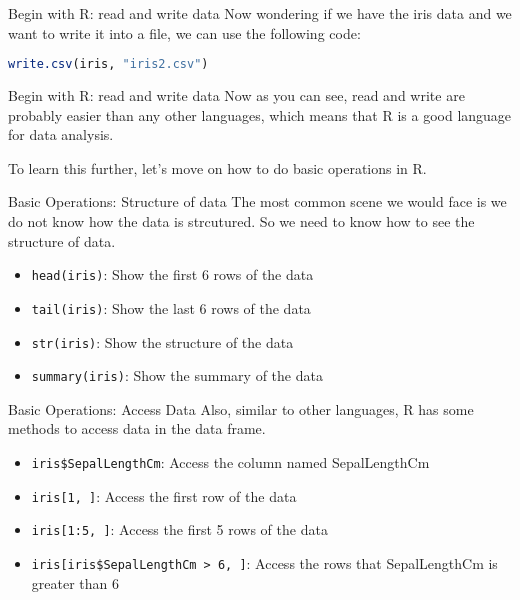 \documentclass[aspectratio=169]{beamer}
\begin{document}
    \begin{frame}[fragile]{Begin with R: read and write data}
        Now wondering if we have the iris data and we want to write it into a file, we can use the following code:\par
        \begin{lstlisting}[language=R]
        write.csv(iris, "iris2.csv")
        \end{lstlisting}
    \end{frame}

    \begin{frame}{Begin with R: read and write data}
        Now as you can see, read and write are probably easier than any other languages, which means that R is a good language for data analysis.\par
        To learn this further, let's move on how to do basic operations in R.\par
    \end{frame}

    \begin{frame}{Basic Operations: Structure of data}
        The most common scene we would face is we do not know how the data is strcutured. So we need to know how to see the structure of data.\par
        \begin{itemize}
            \item \texttt{head(iris)}: Show the first 6 rows of the data
            \item \texttt{tail(iris)}: Show the last 6 rows of the data
            \item \texttt{str(iris)}: Show the structure of the data
            \item \texttt{summary(iris)}: Show the summary of the data
        \end{itemize}
    \end{frame}

    \begin{frame}{Basic Operations: Access Data}
        Also, similar to other languages, R has some methods to access data in the data frame.\par
        \begin{itemize}
            \item \texttt{iris\$SepalLengthCm}: Access the column named SepalLengthCm
            \item \texttt{iris[1, ]}: Access the first row of the data
            \item \texttt{iris[1:5, ]}: Access the first 5 rows of the data
            \item \texttt{iris[iris\$SepalLengthCm > 6, ]}: Access the rows that SepalLengthCm is greater than 6
        \end{itemize}
    \end{frame}
\end{document}
